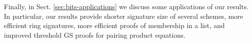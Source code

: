 Finally, in Sect. \ref{sec:bits-applications} we discuss some applications of our results.  
In particular, our results provide shorter %
signature size of several schemes,
  more efficient ring signatures,
  more efficient proofs of membership in a list,
  and improved threshold GS proofs for pairing product equations.



